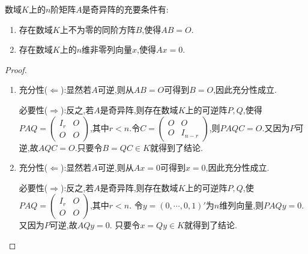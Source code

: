 \documentclass[../../main.tex]{subfiles}
\begin{document}
\begin{proposition}[奇异阵的充要条件]\label{proposition:奇异阵的充要条件}
数域$K$上的$n$阶矩阵$A$是奇异阵的充要条件有:
\begin{enumerate}
\item\label{proposition:奇异阵的充要条件1} 存在数域$K$上不为零的同阶方阵$B$,使得$AB=O$.
\item\label{proposition:奇异阵的充要条件2} 存在数域$K$上的$n$维非零列向量$x$,使得$Ax=0$.
\end{enumerate}
\end{proposition}
\begin{proof}
\begin{enumerate}
\item 充分性($\Leftarrow$):显然若\(A\)可逆,则从\(AB = O\)可得到\(B = O\),因此充分性成立.

必要性($\Rightarrow$):反之,若\(A\)是奇异阵,则存在数域$K$上的可逆阵\(P,Q\),使得\(PAQ = \begin{pmatrix}I_r & O \\ O & O\end{pmatrix}\),其中\(r < n\).令\(C = \begin{pmatrix}O & O \\ O & I_{n - r}\end{pmatrix}\),则\(PAQC = O\).又因为\(P\)可逆,故\(AQC = O\).只要令\(B = QC\in K\)就得到了结论.

\item 充分性($\Leftarrow$):显然若\(A\)可逆,则从\(Ax = 0\)可得到\(x = 0\),因此充分性成立.

必要性($\Rightarrow$):反之,若\(A\)是奇异阵,则存在数域$K$上的可逆阵\(P,Q\),使\(PAQ = \begin{pmatrix}I_r & O \\ O & O\end{pmatrix}\),其中\(r < n\).
令\(y = (0,\cdots,0,1)'\)为\(n\)维列向量,则\(PAQy = 0\).又因为\(P\)可逆,故\(AQy = 0\).
只要令\(x = Qy\in K\)就得到了结论.
\end{enumerate}
\end{proof}
\end{document}
